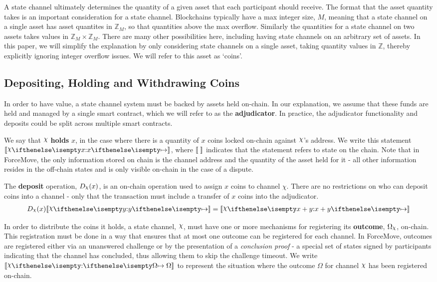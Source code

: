 \documentclass{article}
\begin{document}
A state channel ultimately determines the quantity of a given asset that each participant should receive.
The format that the asset quantity takes is an important consideration for a state channel.
Blockchains typically have a max integer size, $M$, meaning that a state channel on a single asset
has asset quantites in $\mathbb{Z}_M$, so that quantities above the max overflow.
Similarly the quantities for a state channel on two assets takes values in $\mathbb{Z}_M \times \mathbb{Z}_M$.
There are many other possibilities here, including having state channels on an arbitrary set of assets.
In this paper, we will simplify the explanation by only considering state channels on a single
asset, taking quantity values in $\mathbb{Z}$, thereby explicitly ignoring integer overflow issues.
We will refer to this asset as `coins'.

\subsection{Depositing, Holding and Withdrawing Coins}

In order to have value, a state channel system must be backed by assets held on-chain.
In our explanation, we assume that these funds are held and managed by a single smart contract,
which we will refer to as the \textbf{adjudicator}.
In practice, the adjudicator functionality and deposits could be split across multiple smart contracts.

We say that $\rchi$ \textbf{holds} $x$, in the case where there is a quantity of $x$ coins
locked on-chain against $\rchi$'s address.
We write this statement $\adj{\holds{\rchi}{x}{}}$,
where $\llbracket \; \rrbracket$ indicates that the statement refers to state on the chain.
Note that in ForceMove, the only information stored on chain is the channel address and the quantity of the asset held for it - all other information resides in the off-chain states and is only visible on-chain in the case of a dispute.

The \textbf{deposit} operation, $D_\rchi(x)$, is an on-chain operation used to assign $x$ coins to channel $\chi$.
There are no restrictions on who can deposit coins into a channel - only that the
transaction must include a transfer of $x$ coins into the adjudicator.
\begin{align*}
D_\rchi(x) \adj{\holds{\rchi}{y}{}} = \adj{\holds{\rchi}{x + y}{}}
\end{align*}

In order to distribute the coins it holds, a state channel, $\rchi$, must have one or more mechanisms for
registering its \textbf{outcome}, $\Omega_\rchi$, on-chain.
This registration must be done in a way that ensures that at most one outcome can be registered for each channel.
In ForceMove, outcomes are registered either via an unanswered challenge or by the presentation
of a \textit{conclusion proof} - a special set of states signed by participants indicating
that the channel has concluded, thus allowing them to skip the challenge timeout.
We write $\adj{\holds{\rchi}{}{\Omega}}$ to represent the situation where the outcome $\Omega$ for channel $\rchi$ has been registered on-chain.
\end{document}
